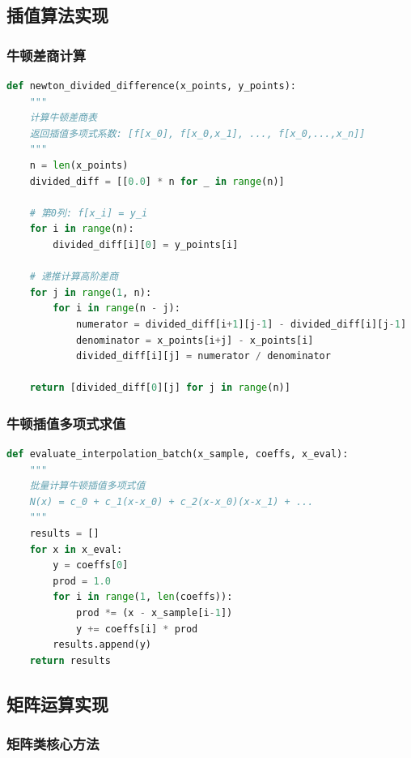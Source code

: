 \documentclass[a4paper,12pt]{article}
\theoremstyle{definition}
\begin{document}
\subsection{插值算法实现}

\subsubsection{牛顿差商计算}

\begin{lstlisting}[language=Python,caption={牛顿差商表计算}]
def newton_divided_difference(x_points, y_points):
    """
    计算牛顿差商表
    返回插值多项式系数: [f[x_0], f[x_0,x_1], ..., f[x_0,...,x_n]]
    """
    n = len(x_points)
    divided_diff = [[0.0] * n for _ in range(n)]
    
    # 第0列: f[x_i] = y_i
    for i in range(n):
        divided_diff[i][0] = y_points[i]
    
    # 递推计算高阶差商
    for j in range(1, n):
        for i in range(n - j):
            numerator = divided_diff[i+1][j-1] - divided_diff[i][j-1]
            denominator = x_points[i+j] - x_points[i]
            divided_diff[i][j] = numerator / denominator
    
    return [divided_diff[0][j] for j in range(n)]
\end{lstlisting}

\subsubsection{牛顿插值多项式求值}

\begin{lstlisting}[language=Python,caption={牛顿插值求值（霍纳法则）}]
def evaluate_interpolation_batch(x_sample, coeffs, x_eval):
    """
    批量计算牛顿插值多项式值
    N(x) = c_0 + c_1(x-x_0) + c_2(x-x_0)(x-x_1) + ...
    """
    results = []
    for x in x_eval:
        y = coeffs[0]
        prod = 1.0
        for i in range(1, len(coeffs)):
            prod *= (x - x_sample[i-1])
            y += coeffs[i] * prod
        results.append(y)
    return results
\end{lstlisting}

\subsection{矩阵运算实现}

\subsubsection{矩阵类核心方法}
\end{document}
